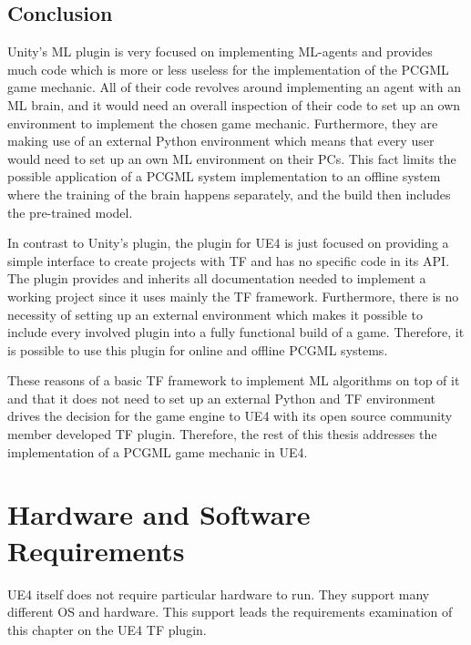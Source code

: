 \documentclass[MGS,Master,english]{twbook}%
\begin{document}
\subsection{Conclusion}
Unity’s \ac{ML} plugin is very focused on implementing \ac{ML}-agents and provides much code which is more or less useless for the implementation of the \ac{PCGML} game mechanic. All of their code revolves around implementing an agent with an \ac{ML} brain, and it would need an overall inspection of their code to set up an own environment to implement the chosen game mechanic. Furthermore, they are making use of an external Python environment which means that every user would need to set up an own \ac{ML} environment on their PCs. This fact limits the possible application of a \ac{PCGML} system implementation to an offline system where the training of the brain happens separately, and the build then includes the pre-trained model.

In contrast to Unity’s plugin, the plugin for \ac{UE4} is just focused on providing a simple interface to create projects with \ac{TF} and has no specific code in its \ac{API}. The plugin provides and inherits all documentation needed to implement a working project since it uses mainly the \ac{TF} framework. Furthermore, there is no necessity of setting up an external environment which makes it possible to include every involved plugin into a fully functional build of a game. Therefore, it is possible to use this plugin for online and offline \ac{PCGML} systems.

These reasons of a basic \ac{TF} framework to implement \ac{ML} algorithms on top of it and that it does not need to set up an external Python and \ac{TF} environment drives the decision for the game engine to \ac{UE4} with its open source community member developed \ac{TF} plugin. Therefore, the rest of this thesis addresses the implementation of a \ac{PCGML} game mechanic in \ac{UE4}.

\section{Hardware and Software Requirements}
\ac{UE4} itself does not require particular hardware to run. They support many different \ac{OS} and hardware. This support leads the requirements examination of this chapter on the \ac{UE4} \ac{TF} plugin.
\end{document}
